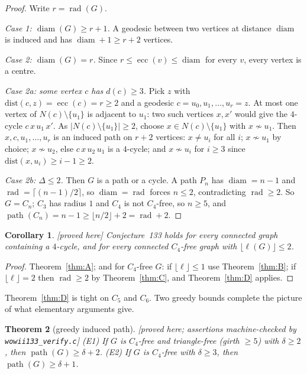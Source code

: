 \documentclass[11pt]{article}
\theoremstyle{plain}
\newtheorem{theorem}{Theorem}[section]
\newtheorem{corollary}[theorem]{Corollary}
\theoremstyle{definition}
\theoremstyle{remark}
\numberwithin{equation}{section}
\newcommand{\rad}{\operatorname{rad}}
\newcommand{\ecc}{\operatorname{ecc}}
\newcommand{\diam}{\operatorname{diam}}
\newcommand{\pth}{\operatorname{path}}
\newcommand{\statusbox}[1]{{\small\sloppy\textsf{[#1]}}}
\newcommand{\PRV}[1]{\statusbox{proved here; assertions machine-checked by \texttt{#1}}}
\newcommand{\PRVn}{\statusbox{proved here}}
\begin{document}
\begin{proof}
Write $r = \rad(G)$.

\emph{Case 1: $\diam(G) \ge r+1$.} A geodesic between two vertices at distance $\diam$ is
induced and has $\diam + 1 \ge r+2$ vertices.

\emph{Case 2: $\diam(G) = r$.} Since $r \le \ecc(v) \le \diam$ for every $v$, every vertex is
a centre.

\emph{Case 2a: some vertex $c$ has $d(c) \ge 3$.} Pick $z$ with
$\mathrm{dist}(c,z) = \ecc(c) = r \ge 2$ and a geodesic $c = u_0, u_1, \dots, u_r = z$. At
most one vertex of $N(c)\setminus\{u_1\}$ is adjacent to $u_1$: two such vertices $x, x'$
would give the $4$-cycle $c\,x\,u_1\,x'$. As $|N(c)\setminus\{u_1\}| \ge 2$, choose
$x \in N(c)\setminus\{u_1\}$ with $x \not\sim u_1$. Then $x, c, u_1, \dots, u_r$ is an
induced path on $r+2$ vertices: $x \ne u_i$ for all $i$; $x \not\sim u_1$ by choice;
$x\not\sim u_2$, else $c\,x\,u_2\,u_1$ is a $4$-cycle; and $x \not\sim u_i$ for $i \ge 3$
since $\mathrm{dist}(x,u_i) \ge i-1 \ge 2$.

\emph{Case 2b: $\Delta \le 2$.} Then $G$ is a path or a cycle. A path $P_n$ has
$\diam = n-1$ and $\rad = \lceil (n-1)/2\rceil$, so $\diam = \rad$ forces $n \le 2$,
contradicting $\rad \ge 2$. So $G = C_n$; $C_3$ has radius $1$ and $C_4$ is not $C_4$-free,
so $n \ge 5$, and $\pth(C_n) = n-1 \ge \lfloor n/2\rfloor + 2 = \rad + 2$.
\end{proof}

\begin{corollary}\label{cor:D1}
\PRVn
Conjecture~133 holds for every connected graph containing a $4$-cycle, and for every
connected $C_4$-free graph with $\lfloor \ell(G)\rfloor \le 2$.
\end{corollary}

\begin{proof}
Theorem~\ref{thm:A}; and for $C_4$-free $G$: if $\lfloor\ell\rfloor \le 1$ use
Theorem~\ref{thm:B}; if $\lfloor\ell\rfloor = 2$ then $\rad \ge 2$ by Theorem~\ref{thm:C},
and Theorem~\ref{thm:D} applies.
\end{proof}

Theorem~\ref{thm:D} is tight on $C_5$ and $C_6$. Two greedy bounds complete the picture of
what elementary arguments give.

\begin{theorem}[greedy induced path]\label{thm:E}
\PRV{wowii133\_verify.c}
{\rm (E1)} If $G$ is $C_4$-free and triangle-free (girth $\ge 5$) with $\delta \ge 2$, then
$\pth(G) \ge \delta + 2$.
{\rm (E2)} If $G$ is $C_4$-free with $\delta \ge 3$, then $\pth(G) \ge \delta + 1$.
\end{theorem}
\end{document}
